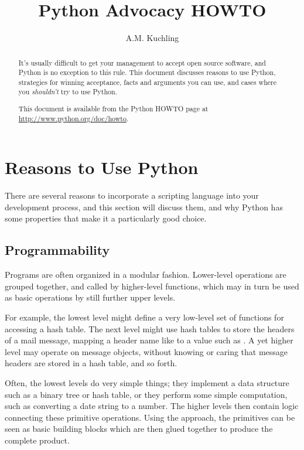 \documentclass{howto}
\title{Python Advocacy HOWTO}
\author{A.M. Kuchling}
\begin{document}
\maketitle

\begin{abstract}
\noindent
It's usually difficult to get your management to accept open source
software, and Python is no exception to this rule.  This document
discusses reasons to use Python, strategies for winning acceptance,
facts and arguments you can use, and cases where you \emph{shouldn't}
try to use Python.

This document is available from the Python HOWTO page at
\url{http://www.python.org/doc/howto}.

\end{abstract}

\tableofcontents

\section{Reasons to Use Python}

There are several reasons to incorporate a scripting language into
your development process, and this section will discuss them, and why
Python has some properties that make it a particularly good choice.

 \subsection{Programmability}

Programs are often organized in a modular fashion.  Lower-level
operations are grouped together, and called by higher-level functions,
which may in turn be used as basic operations by still further upper
levels.  

For example, the lowest level might define a very low-level
set of functions for accessing a hash table.  The next level might use
hash tables to store the headers of a mail message, mapping a header
name like  to a value such as .  A yet higher level may operate on message objects,
without knowing or caring that message headers are stored in a hash
table, and so forth.  

Often, the lowest levels do very simple things; they implement a data
structure such as a binary tree or hash table, or they perform some
simple computation, such as converting a date string to a number.  The
higher levels then contain logic connecting these primitive
operations.  Using the approach, the primitives can be seen as basic
building blocks which are then glued together to produce the complete
product.  
\end{document}
